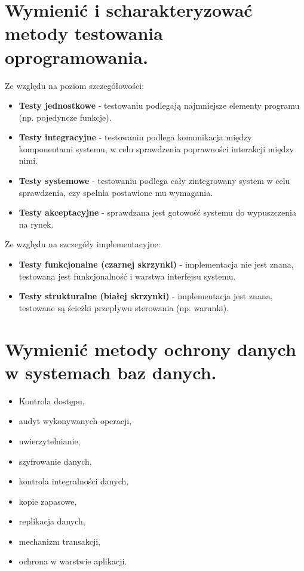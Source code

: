 \documentclass[12pt,a4paper]{article}
\begin{document}
	\section{Wymienić i scharakteryzować metody testowania oprogramowania.}
	Ze względu na poziom szczegółowości:
		\begin{itemize}
			\item \textbf{Testy jednostkowe} - testowaniu podlegają najmniejsze elementy programu (np. pojedyncze funkcje).
			\item \textbf{Testy integracyjne} - testowaniu podlega komunikacja między komponentami systemu, w celu sprawdzenia poprawności interakcji między nimi.
			\item \textbf{Testy systemowe} - testowaniu podlega cały zintegrowany system w celu sprawdzenia, czy spełnia postawione mu wymagania.
			\item \textbf{Testy akceptacyjne} - sprawdzana jest gotowość systemu do wypuszczenia na rynek.
		\end{itemize}
	Ze względu na szczegóły implementacyjne:
		\begin{itemize}
			\item \textbf{Testy funkcjonalne (czarnej skrzynki)} - implementacja nie jest znana, testowana jest funkcjonalność i warstwa interfejsu systemu.
			\item \textbf{Testy strukturalne (białej skrzynki)} - implementacja jest znana, testowane są ścieżki przepływu sterowania (np. warunki).
		\end{itemize}

	\section{Wymienić metody ochrony danych w systemach baz danych.}
	\begin{multicols}{2}
		\begin{itemize}
			\item Kontrola dostępu,
			\item audyt wykonywanych operacji,
			\item uwierzytelnianie,
			\item szyfrowanie danych,
			\item kontrola integralności danych,
			\item kopie zapasowe,
			\item replikacja danych,
			\item mechanizm transakcji,
			\item ochrona w warstwie aplikacji.
		\end{itemize}
	\end{multicols}
\end{document}
